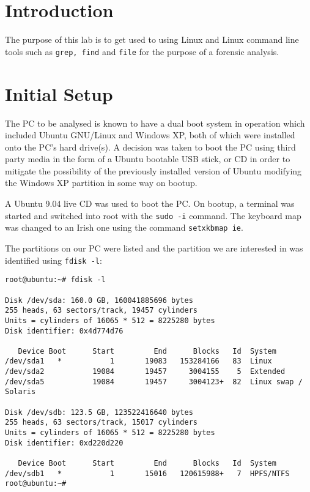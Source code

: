 \documentclass[a4paper,
    11pt,
    normalheadings,
    parindent,
    UKenglish,
    abstracton,
    ]{scrartcl}
\title{\mytitle{}}
\author{
    cand. Dipl. Inf. Tobias Müller <\href{mailto:muellet2@computing.dcu.ie?subject=ss10-forensic-lab01}{muellet2@}>, 59212333 \and
    BSc. Anthony Walters <\href{mailto:waltersa3@computing.dcu.ie?subject=ss10-forensic-lab01}{waltersa3@}>, 59213102
    }
\date{\today}
\begin{document}
\maketitle


\section{Introduction}

The purpose of this lab is to get used to using Linux and Linux command line tools such as {\tt grep, find} and {\tt file} for the purpose of a forensic analysis.

\section{Initial Setup}

The PC to be analysed is known to have a dual boot system in operation which included Ubuntu GNU/Linux and Windows XP, both of which were installed onto the PC's hard drive(s).
A decision was taken to boot the PC using third party media in the form of a Ubuntu bootable USB stick, or CD in order to mitigate the possibility of the previously installed version of Ubuntu modifying the Windows XP partition in some way on bootup.

A Ubuntu 9.04 live CD was used to boot the PC. On bootup, a terminal was started and switched into root with the {\tt sudo -i} command. The keyboard map was changed to an Irish one using the command {\tt setxkbmap ie}.

The partitions on our PC were listed and the partition we are interested in was identified using {\tt fdisk -l}:

\begin{verbatim}
root@ubuntu:~# fdisk -l

Disk /dev/sda: 160.0 GB, 160041885696 bytes
255 heads, 63 sectors/track, 19457 cylinders
Units = cylinders of 16065 * 512 = 8225280 bytes
Disk identifier: 0x4d774d76

   Device Boot      Start         End      Blocks   Id  System
/dev/sda1   *           1       19083   153284166   83  Linux
/dev/sda2           19084       19457     3004155    5  Extended
/dev/sda5           19084       19457     3004123+  82  Linux swap / Solaris

Disk /dev/sdb: 123.5 GB, 123522416640 bytes
255 heads, 63 sectors/track, 15017 cylinders
Units = cylinders of 16065 * 512 = 8225280 bytes
Disk identifier: 0xd220d220

   Device Boot      Start         End      Blocks   Id  System
/dev/sdb1   *           1       15016   120615988+   7  HPFS/NTFS
root@ubuntu:~#
\end{verbatim}
\end{document}
